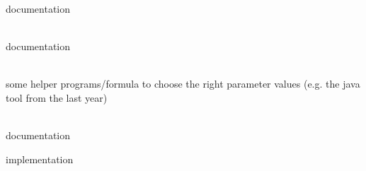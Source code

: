 \begin{DoxyRefList}
documentation


\item[{\parbox[t]{\linewidth}{Class \doxylink{classmodm_1_1_s_curve_controller}{modm::\+SCurve\+Controller\texorpdfstring{$<$}{<} T \texorpdfstring{$>$}{>}} }}]\hfill \\
\label{todo__todo000011}%
%
documentation 
\item[{\parbox[t]{\linewidth}{Struct \doxylink{structmodm_1_1_s_curve_controller_1_1_parameter}{modm::\+SCurve\+Controller\texorpdfstring{$<$}{<} T \texorpdfstring{$>$}{>}::\+Parameter} }}]\hfill \\
\label{todo__todo000012}%
%
some helper programs/\+formula to choose the right parameter values (e.\+g. the java tool from the last year) 
\item[{\parbox[t]{\linewidth}{Class \doxylink{classmodm_1_1_s_curve_generator}{modm::\+SCurve\+Generator\texorpdfstring{$<$}{<} T \texorpdfstring{$>$}{>}} }}]\hfill \\
\label{todo__todo000013}%
%
documentation 



implementation


\end{DoxyRefList}